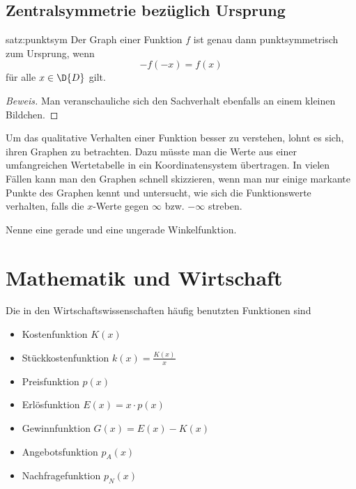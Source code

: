 \documentclass[%
11pt,%
twoside,%
titlepage,%
german,%
headsepline%
]{scrartcl}
\begin{document}
\subsection{Zentralsymmetrie bez\"uglich Ursprung}
\begin{csatz}{satz:punktsym}
Der Graph einer Funktion $f$ ist genau dann punktsymmetrisch zum Ursprung, wenn
$$-f(-x) = f(x)$$
f\"ur alle $x\in\D{D}$ gilt.
\end{csatz}
\begin{proof}[Beweis]
Man veranschauliche sich den Sachverhalt ebenfalls an einem kleinen Bildchen.
\end{proof}

Um das qualitative Verhalten einer Funktion besser zu verstehen, lohnt es sich, ihren Graphen zu betrachten. Dazu m\"usste man die Werte aus einer umfangreichen Wertetabelle in ein Koordinatensystem \"ubertragen. In vielen F\"allen kann man den Graphen schnell skizzieren, wenn man nur einige markante Punkte des Graphen kennt und untersucht, wie sich die Funktionswerte verhalten, falls die $x$-Werte gegen $\infty$ bzw. $-\infty$ streben.

\begin{ueb}
Nenne eine gerade und eine ungerade Winkelfunktion.
\end{ueb}

\clearpage

\section{Mathematik und Wirtschaft}
Die in den Wirtschaftswissenschaften h\"aufig benutzten Funktionen sind
\begin{itemize}
\item Kostenfunktion $K(x)$
\item St\"uckkostenfunktion $k(x)=\frac{K(x)}{x}$
\item Preisfunktion $p(x)$
\item Erl\"osfunktion $E(x)=x\cdot p(x)$
\item Gewinnfunktion $G(x)=E(x)-K(x)$
\item Angebotsfunktion $p_A(x)$
\item Nachfragefunktion $p_N(x)$
\end{itemize}
\end{document}

